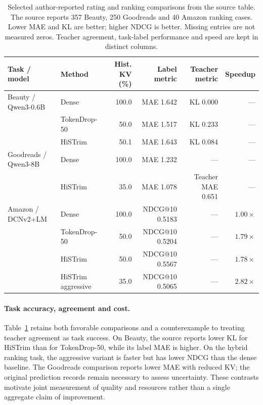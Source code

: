 \begin{table}[t]
\centering\small
\begin{tabular}{llrrrr}
\toprule
Task / model & Method & Hist. KV (\%) & Label metric & Teacher metric & Speedup \\
\midrule
Beauty / Qwen3-0.6B & Dense & 100.0 & MAE 1.642 & KL 0.000 & --- \\
 & TokenDrop-50 & 50.0 & MAE 1.517 & KL 0.233 & --- \\
 & HiSTrim & 50.1 & MAE 1.643 & KL 0.084 & --- \\
\midrule
Goodreads / Qwen3-8B & Dense & 100.0 & MAE 1.232 & --- & --- \\
 & HiSTrim & 35.0 & MAE 1.078 & Teacher MAE 0.651 & --- \\
\midrule
Amazon / DCNv2+LM & Dense & 100.0 & NDCG@10 0.5183 & --- & $1.00\times$ \\
 & TokenDrop-50 & 50.0 & NDCG@10 0.5204 & --- & $1.79\times$ \\
 & HiSTrim & 50.0 & NDCG@10 0.5567 & --- & $1.78\times$ \\
 & HiSTrim aggressive & 35.0 & NDCG@10 0.5065 & --- & $2.82\times$ \\
\bottomrule
\end{tabular}
\caption{Selected author-reported rating and ranking comparisons from the source table.
The source reports 357 Beauty, 250 Goodreads and 40 Amazon ranking cases. Lower MAE
and KL are better; higher NDCG is better. Missing entries are not measured zeros.
Teacher agreement, task-label performance and speed are kept in distinct columns.}
\label{tab:histrim_task_fidelity}
\end{table}

\paragraph{Task accuracy, agreement and cost.}
Table~\ref{tab:histrim_task_fidelity} retains both favorable comparisons and a
counterexample to treating teacher agreement as task success. On Beauty, the source
reports lower KL for HiSTrim than for TokenDrop-50, while its label MAE is higher.
On the hybrid ranking task, the aggressive variant is faster but has lower NDCG than
the dense baseline. The Goodreads comparison reports lower MAE with reduced KV;
the original prediction records remain necessary to assess uncertainty. These
contrasts motivate joint measurement of quality and resources rather than a single
aggregate claim of improvement.

